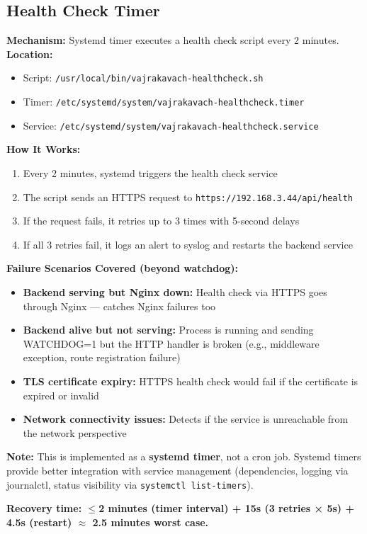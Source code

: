 \documentclass[11pt,a4paper]{article}
\begin{document}
\subsection{Health Check Timer}

\begin{tcolorbox}[colback=recoveryblue!5, colframe=recoveryblue]
\textbf{Mechanism:} Systemd timer executes a health check script every 2 minutes.\\
\textbf{Location:}
\begin{itemize}[nosep]
  \item Script: \texttt{/usr/local/bin/vajrakavach-healthcheck.sh}
  \item Timer: \texttt{/etc/systemd/system/vajrakavach-healthcheck.timer}
  \item Service: \texttt{/etc/systemd/system/vajrakavach-healthcheck.service}
\end{itemize}
\textbf{How It Works:}
\begin{enumerate}[nosep]
  \item Every 2 minutes, systemd triggers the health check service
  \item The script sends an HTTPS request to \texttt{https://192.168.3.44/api/health}
  \item If the request fails, it retries up to 3 times with 5-second delays
  \item If all 3 retries fail, it logs an alert to syslog and restarts the backend service
\end{enumerate}
\textbf{Failure Scenarios Covered (beyond watchdog):}
\begin{itemize}[nosep]
  \item \textbf{Backend serving but Nginx down:} Health check via HTTPS goes through Nginx — catches Nginx failures too
  \item \textbf{Backend alive but not serving:} Process is running and sending WATCHDOG=1 but the HTTP handler is broken (e.g., middleware exception, route registration failure)
  \item \textbf{TLS certificate expiry:} HTTPS health check would fail if the certificate is expired or invalid
  \item \textbf{Network connectivity issues:} Detects if the service is unreachable from the network perspective
\end{itemize}
\textbf{Note:} This is implemented as a \textbf{systemd timer}, not a cron job. Systemd timers provide better integration with service management (dependencies, logging via journalctl, status visibility via \texttt{systemctl list-timers}).

\textbf{Recovery time: $\leq$2 minutes (timer interval) + 15s (3 retries × 5s) + 4.5s (restart) $\approx$ 2.5 minutes worst case.}
\end{tcolorbox}
\end{document}
